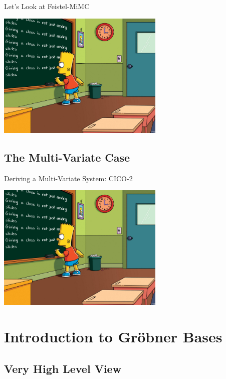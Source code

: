 \documentclass[aspectratio=169]{beamer}
\begin{document}
\begin{frame}{Let's Look at Feistel-MiMC}
  \vfill

  \begin{center}
    \includegraphics[width=8cm]{./figures/simpsons}
  \end{center}
  
  \vfill
\end{frame}


\subsection{The Multi-Variate Case}


\begin{frame}{Deriving a Multi-Variate System: CICO-2}
  \vfill

  \begin{center}
    \includegraphics[width=8cm]{./figures/simpsons}
  \end{center}
  
  \vfill
\end{frame}


\section{Introduction to Gröbner Bases}

\subsection{Very High Level View}
\end{document}
